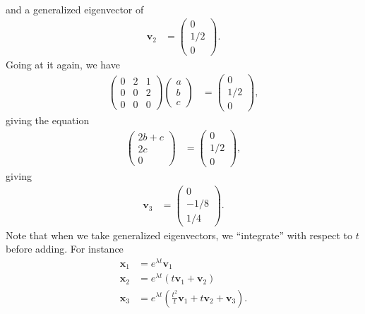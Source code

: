 \documentclass[10pt]{mypackage}
\begin{document}
\begin{example}
\begin{align*}
  \end{align*}
  and a generalized eigenvector of
  \begin{align*}
    \mathbf{v}_2 &= \begin{pmatrix}0\\1/2\\0\end{pmatrix}.
  \end{align*}
  Going at it again, we have
  \begin{align*}
    \begin{pmatrix}0 & 2 & 1 \\ 0 & 0 & 2 \\ 0 & 0 & 0\end{pmatrix} \begin{pmatrix}a\\b\\c\end{pmatrix} &= \begin{pmatrix}0\\1/2\\0\end{pmatrix},
  \end{align*}
  giving the equation
  \begin{align*}
    \begin{pmatrix}2b + c\\2c\\0\end{pmatrix} &= \begin{pmatrix}0\\1/2\\0\end{pmatrix},
  \end{align*}
  giving
  \begin{align*}
    \mathbf{v}_3 &= \begin{pmatrix}0\\-1/8\\1/4\end{pmatrix}.
  \end{align*}
  Note that when we take generalized eigenvectors, we ``integrate'' with respect to $t$ before adding. For instance
  \begin{align*}
    \mathbf{x}_1 &= e^{\lambda t} \mathbf{v}_1\\
    \mathbf{x}_2 &= e^{\lambda t} \left( t \mathbf{v}_1 + \mathbf{v}_2 \right)\\
    \mathbf{x}_3 &= e^{\lambda t} \left( \frac{t^2}{t}\mathbf{v}_1 + t\mathbf{v}_2 + \mathbf{v}_3 \right).
  \end{align*}

\end{example}
\end{document}
